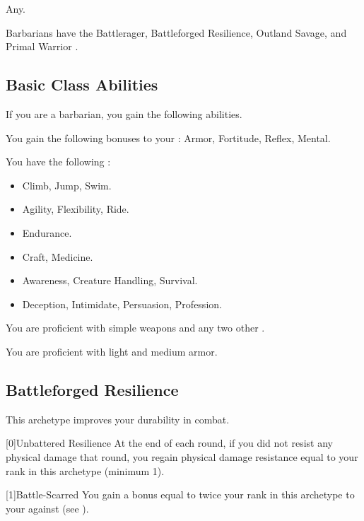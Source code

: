      Any.

     Barbarians have the Battlerager, Battleforged Resilience, Outland Savage, and Primal Warrior .

    \subsection{Basic Class Abilities}
        If you are a barbarian, you gain the following abilities.

        You gain the following bonuses to your :  Armor,  Fortitude,  Reflex,  Mental.

        You have the following :
        \begin{itemize}
            \item {} Climb, Jump, Swim.
            \item {} Agility, Flexibility, Ride.
            \item {} Endurance.
            \item {} Craft, Medicine.
            \item {} Awareness, Creature Handling, Survival.
            \item {} Deception, Intimidate, Persuasion, Profession.
        \end{itemize}

        You are proficient with simple weapons and any two other .

        You are proficient with light and medium armor.

    \newpage
    \subsection{Battleforged Resilience}
        This archetype improves your durability in combat.

        [0]{Unbattered Resilience} At the end of each round, if you did not resist any physical damage that round, you regain physical damage resistance equal to your rank in this archetype (minimum 1).

        [1]{Battle-Scarred} You gain a bonus equal to twice your rank in this archetype to your  against  (see ).

